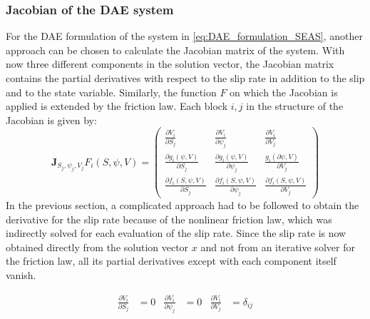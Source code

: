 \documentclass{report}
\begin{document}
\subsubsection{Jacobian of the DAE system}
\label{sssec:Jacobian_DAE}
For the DAE formulation of the system in \autoref{eq:DAE_formulation_SEAS}, another approach can be chosen to calculate the Jacobian matrix of the system. With now three different components in the solution vector, the Jacobian matrix contains the partial derivatives with respect to the slip rate in addition to the slip and to the state variable. Similarly, the function $F$ on which the Jacobian is applied is extended by the friction law. Each block $i,j$ in the structure of the Jacobian is given by:
\begin{equation}
	\label{eq:Jacobian_DAE_formulation}
	\mathbf{J}_{S_j,\psi_j,V_j}F_i(S,\psi,V) = 	\begin{pmatrix}
											\frac{\partial V_i}{\partial S_j} & \frac{\partial V_i}{\partial \psi_j} & \frac{\partial V_i}{\partial V_j} \\
											\frac{\partial g_i(\psi,V)}{\partial S_j} & \frac{\partial g_i(\psi,V)}{\partial \psi_j} & \frac{g_i(\partial \psi,V)}{\partial V_j} \\
											\frac{\partial f_i(S,\psi,V)}{\partial S_j} & \frac{\partial f_i(S,\psi,V)}{\partial \psi_j} & \frac{\partial f_i(S,\psi,V)}{\partial V_j}
										\end{pmatrix}
\end{equation}
In the previous section, a complicated approach had to be followed to obtain the derivative for the slip rate because of the nonlinear friction law, which was indirectly solved for each evaluation of the slip rate. Since the slip rate is now obtained directly from the solution vector $x$ and not from an iterative solver for the friction law, all its partial derivatives except with each component itself vanish. 

\begin{align}	
	\frac{\partial V_i}{\partial S_j} &= 0 & \frac{\partial V_i}{\partial \psi_j} &= 0 & \frac{\partial V_i}{\partial V_j} &= \delta_{ij}
\end{align}
\end{document}
